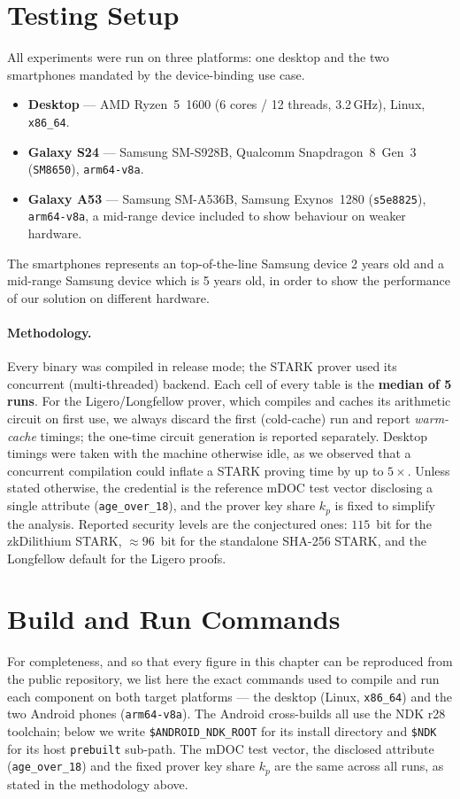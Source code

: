 \documentclass[binding=0.6cm,oneside,noexaminfo]{sapthesis}
\begin{document}
\section{Testing Setup}
\label{results:setup}
All experiments were run on three platforms: one desktop and the two
smartphones mandated by the device-binding use case.
\begin{itemize}[noitemsep]
  \item \textbf{Desktop} --- AMD Ryzen~5~1600 (6 cores / 12 threads, 3.2\,GHz),
        Linux, \texttt{x86\_64}.
  \item \textbf{Galaxy S24} --- Samsung SM-S928B, Qualcomm Snapdragon~8~Gen~3
        (\texttt{SM8650}), \texttt{arm64-v8a}.
  \item \textbf{Galaxy A53} --- Samsung SM-A536B, Samsung Exynos~1280
        (\texttt{s5e8825}), \texttt{arm64-v8a}, a mid-range device included to
        show behaviour on weaker hardware.
\end{itemize}
The smartphones represents an top-of-the-line Samsung device 2 years old 
and a mid-range Samsung device which is 5 years old, in order to show the 
performance of our solution on different hardware.

\paragraph{Methodology.} Every binary was compiled in release mode; the STARK
prover used its concurrent (multi-threaded) backend. Each cell of every table is
the \textbf{median of 5 runs}. For the Ligero/Longfellow prover, which compiles
and caches its arithmetic circuit on first use, we always discard the first
(cold-cache) run and report \emph{warm-cache} timings; the one-time circuit
generation is reported separately. Desktop timings were taken with the machine
otherwise idle, as we observed that a concurrent compilation could inflate a
STARK proving time by up to $5\times$. Unless stated otherwise, the credential
is the reference mDOC test vector disclosing a single attribute
(\texttt{age\_over\_18}), and the prover key share $k_p$ is fixed to simplify 
the analysis. Reported security levels are the conjectured ones: $115$~bit for
the zkDilithium STARK, ${\approx}96$~bit for the standalone SHA-256 STARK, and
the Longfellow default for the Ligero proofs.

\section{Build and Run Commands}
\label{results:repro}
For completeness, and so that every figure in this chapter can be reproduced from
the public repository, we list here the exact commands used to compile and run
each component on both target platforms --- the desktop (Linux, \texttt{x86\_64})
and the two Android phones (\texttt{arm64-v8a}). The Android cross-builds all use
the NDK r28 toolchain; below we write \texttt{\$ANDROID\_NDK\_ROOT} for its
install directory and \texttt{\$NDK} for its host \texttt{prebuilt} sub-path. The
mDOC test vector, the disclosed attribute (\texttt{age\_over\_18}) and the fixed
prover key share $k_p$ are the same across all runs, as stated in the methodology
above.
\end{document}
